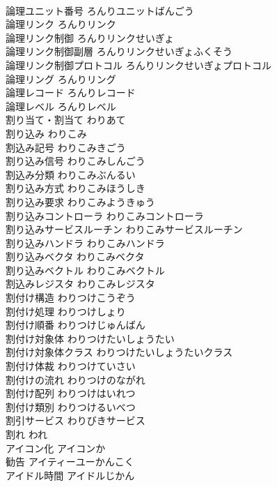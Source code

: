 \documentclass[8pt]{extreport}
\begin{document}
\begin{CJK}{UTF8}{min}
\\	論理ユニット番号	ろんりユニットばんごう	
\\	論理リンク	ろんりリンク	
\\	論理リンク制御	ろんりリンクせいぎょ	
\\	論理リンク制御副層	ろんりリンクせいぎょふくそう	
\\	論理リンク制御プロトコル	ろんりリンクせいぎょプロトコル	
\\	論理リング	ろんりリング	
\\	論理レコード	ろんりレコード	
\\	論理レベル	ろんりレベル	
\\	割り当て・割当て	わりあて	
\\	割り込み	わりこみ	
\\	割込み記号	わりこみきごう	
\\	割り込み信号	わりこみしんごう	
\\	割込み分類	わりこみぶんるい	
\\	割り込み方式	わりこみほうしき	
\\	割り込み要求	わりこみようきゅう	
\\	割り込みコントローラ	わりこみコントローラ	
\\	割り込みサービスルーチン	わりこみサービスルーチン	
\\	割り込みハンドラ	わりこみハンドラ	
\\	割り込みベクタ	わりこみベクタ	
\\	割り込みベクトル	わりこみベクトル	
\\	割込みレジスタ	わりこみレジスタ	
\\	割付け構造	わりつけこうぞう	
\\	割付け処理	わりつけしょり	
\\	割付け順番	わりつけじゅんばん	
\\	割付け対象体	わりつけたいしょうたい	
\\	割付け対象体クラス	わりつけたいしょうたいクラス	
\\	割付け体裁	わりつけていさい	
\\	割付けの流れ	わりつけのながれ	
\\	割付け配列	わりつけはいれつ	
\\	割付け類別	わりつけるいべつ	
\\	割引サービス	わりびきサービス	
\\	割れ	われ	
\\	アイコン化	アイコンか	
\\	勧告	アイティーユーかんこく	
\\	アイドル時間	アイドルじかん	

\end{CJK}
\end{document}

